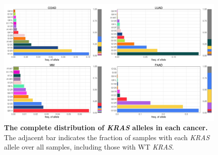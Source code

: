 \documentclass[english, 10pt, letterpaper]{article}
\newcommand{\beginsupplement}{%
        \setcounter{table}{0}
        \renewcommand{\thetable}{\arabic{table}}%
        \setcounter{figure}{0}
        \renewcommand{\thefigure}{\arabic{figure}}%
     }
\newcommand{\KRAS}{\emph{KRAS}}
\begin{document}
\beginsupplement



\begin{figure}[p]
\centering
\includegraphics[width=\textwidth]{figures/SuppFigure_01.jpeg}
\caption{
    \textbf{The complete distribution of \KRAS{} alleles in each cancer.} The adjacent bar indicates the fraction of samples with each \KRAS{} allele over all samples, including those with WT \KRAS{}.
}
\label{sfig:expanded-kras-allele-distribution}
\end{figure}
\end{document}
